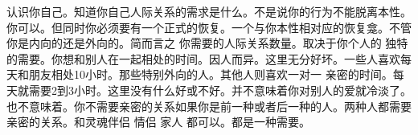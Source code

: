 认识你自己。知道你自己人际关系的需求是什么。不是说你的行为不能脱离本性。你可以。但同时你必须要有一个正式的恢复。一个与你本性相对应的恢复龛。不管你是内向的还是外向的。简而言之 你需要的人际关系数量。取决于你个人的 独特的需要。你想和别人在一起相处的时间。因人而异。这里无分好坏。一些人喜欢每天和朋友相处10小时。那些特别外向的人。其他人则喜欢一对一 亲密的时间。每天就需要2到3小时。这里没有什么好或不好。并不意味着你对别人的爱就冷淡了。也不意味着。你不需要亲密的关系如果你是前一种或者后一种的人。两种人都需要亲密的关系。和灵魂伴侣 情侣 家人 都可以。都是一种需要。 
%
%
%
